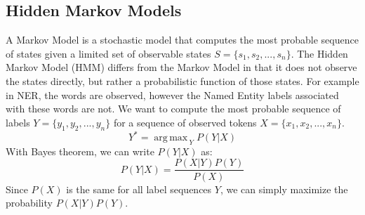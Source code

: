 \documentclass{nle}
\DeclareMathOperator*{\argmax}{arg\,max\,}
\begin{document}
\subsection{Hidden Markov Models}

A Markov Model is a stochastic model that computes the most probable sequence of states 
given a limited set of observable states $ S = \{s_1, s_2, ..., s_n \} $.
The Hidden Markov Model (HMM) differs from the Markov Model in that it
does not observe the states directly, but rather a probabilistic function of those 
states. For example in NER, the words are observed, however the Named Entity labels
associated with these words are not. We want to compute the most probable
sequence of labels $ Y = \{y_1, y_2, ..., y_n\} $ for a sequence of observed tokens
$ X = \{x_1, x_2, ..., x_n\} $.
%
\begin{equation}
Y^* = \argmax_{Y} P(Y|X)
\end{equation}
%
With Bayes theorem, we can write $ P(Y|X) $ as:
%
\begin{equation}
P(Y|X) = \frac{P(X|Y) P(Y)}{P(X)}
\end{equation}
%
Since $ P(X) $ is the same for all label sequences $ Y $, we can simply maximize
the probability $ P(X|Y) P(Y) $.
\end{document}
